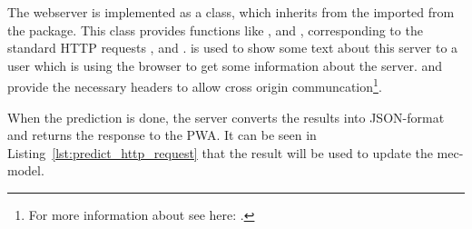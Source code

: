 The webserver is implemented as a  class, which inherits from the  imported from the  package.
This class provides functions like ,  and , corresponding to the standard HTTP requests ,  and .
 is used to show some text about this server to a user which is using the browser to get some information about the server.
 and  provide the necessary headers to allow cross origin communcation\footnote{For more information about  see here: .}.

When the prediction is done, the server converts the results into JSON-format and returns the response to the PWA.
It can be seen in Listing~\ref{lst:predict_http_request} that the result will be used to update the mec-model.

